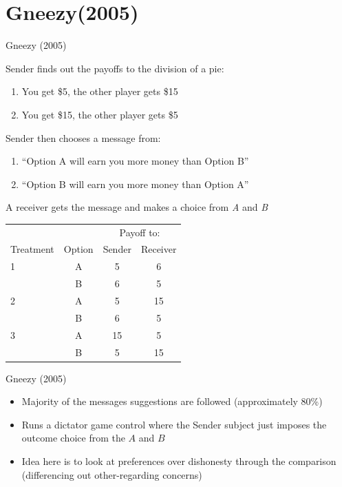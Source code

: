 \documentclass{beamer}
\begin{document}
\section{Gneezy(2005)}
\begin{frame}{Gneezy (2005)}
	\begin{card}
	 Sender finds out the payoffs to the division of a pie:
		\begin{enumerate}[A]
			\item You get \$5, the other player gets \$15
			\item You get \$15, the other player gets \$5
		\end{enumerate}
		Sender then chooses a message from:
		\begin{enumerate}[a]
			\item ``Option A will earn you more money than Option B''
			\item ``Option B will earn you more money than Option A''
		\end{enumerate}
		A receiver gets the message and makes a choice from \emph{A} and \emph{B}
	\end{card}
\end{frame}



\begin{frame}
	\begin{card}[Treatments]
	\centering
		\begin{tabular}{lccc}\toprule
		& & \multicolumn{2}{c}{Payoff to:}\\ \cline{3-4}
		Treatment & Option & Sender & Receiver \\ \midrule
		1		  &   A  & 5 & 6  \\
				  &   B  & 6 & 5  \\
		2		  &   A  & 5 & 15 \\
				  &   B  & 6 & 5  \\
		3		  &   A  & 15 & 5 \\
				  &   B  & 5 & 15 \\ \bottomrule	  
		\end{tabular}
	\end{card}
\end{frame}
\begin{frame}{Gneezy (2005)}
\begin{card}
	\begin{itemize}
		\item Majority of the messages suggestions are followed (approximately 80\%)
		\item Runs a dictator game control where the Sender subject just imposes the outcome choice from the $A$ and $B$
		\item Idea here is to look at preferences over dishonesty through the comparison (differencing out other-regarding concerns)
	\end{itemize}
\end{card}
\end{frame}
\end{document}
